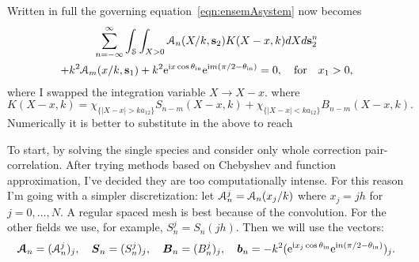 \documentclass[12pt, a4paper]{article}
\begin{document}
Written in full the governing equation~\eqref{eqn:ensemAsystem} now becomes
\begin{multline}
 \sum_{n=-\infty}^\infty \int_\mathcal S
  \int_{X> 0} \mathcal A_n (X/k, \mathbf s_2) K(X - x,k) dX
  d\mathbf s_2^n
\\
+  k^2 \mathcal A_m (x/k, \mathbf s_1)   + k^2  \textrm{e}^{\textrm{i} x \cos \theta_{\mathrm{in}}} \textrm{e}^{\textrm{i} m ( \pi/2 - \theta_{\mathrm{in}} )}
   = 0, \quad \text{for} \quad x_1 >0,
  \label{eqn:ensemAsystem2}
\end{multline}
where I swapped the integration variable $X \to X - x$.
where
\begin{equation}
K(X-x,k) =   \chi_{\{ |X-x|> k a_{12}\}}  S_{n-m}(X-x,k)
 + \chi_{\{ |X - x|< k a_{12}\}}   B_{n-m}(X- x,k).
\label{eqn:kernel}
\end{equation}
Numerically it is better to substitute in the above to reach

To start, by solving the single species and consider only whole correction pair-correlation. After trying methods based on Chebyshev and function approximation, I've decided they are too computationally intense. For this reason I'm going with a simpler discretization: let $\mathcal A_n^j = \mathcal A_n (x_j/k)$ where $x_j = j h$ for $j=0,\ldots,N$. A regular spaced mesh is best because of the convolution. For the other fields we use, for example, $S_n^j = S_n(j h)$. Then we will use the vectors:
\begin{equation}
  \boldsymbol{\mathcal A}_n = (\mathcal A_n^j)_j, \quad \boldsymbol{S}_n = (S_n^j)_j, \quad \boldsymbol{B}_n = (B_n^j)_j, \quad \boldsymbol{b}_n = - k^2(\textrm{e}^{ \textrm{i} x_j \cos \theta_{\mathrm{in}}} \textrm{e}^{\textrm{i} n ( \pi/2 - \theta_{\mathrm{in}} )})_j.
\end{equation}
\end{document}
